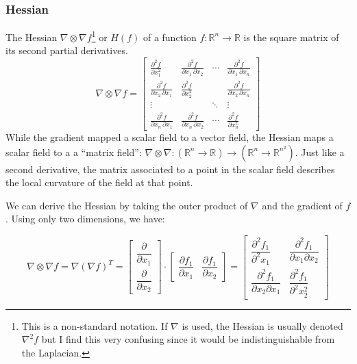 \documentclass{article}
\begin{document}
\subsubsection{Hessian}

The Hessian $\nabla \otimes \nabla f$\footnote{This is a non-standard notation.
If $\nabla$ is used, the Hessian is usually denoted $\nabla^2 f$ but I find this
very confusing since it would be indistinguishable from the Laplacian.} or
$H(f)$ of a function $ f: \mathbb{R}^n \longrightarrow \mathbb{R} $ is the
square matrix of its second partial derivatives. \[
    \nabla \otimes \nabla f =
    \begin{bmatrix}
        \frac{\partial^2 f}{\partial x_1^2} &
        \frac{\partial^2 f}{\partial x_1\,\partial x_2} &
        \cdots & \frac{\partial^2 f}{\partial x_1\,\partial x_n} \\ 
        \frac{\partial^2 f}{\partial x_2\,\partial x_1}
        & \frac{\partial^2 f}{\partial x_2^2} &  &
        \frac{\partial^2 f}{\partial x_2\,\partial x_n} \\ 
        \vdots &   & \ddots & \vdots \\ 
        \frac{\partial^2 f}{\partial x_n\,\partial x_1}
        & \frac{\partial^2 f}{\partial x_n\,\partial x_2} &
        \cdots & \frac{\partial^2 f}{\partial x_n^2}
    \end{bmatrix}
\]
While the gradient mapped a scalar field to a vector field, the Hessian maps a
scalar field to a a ``matrix field'': $\nabla \otimes \nabla : (\mathbb{R}^n
\rightarrow \mathbb{R}) \longrightarrow (\mathbb{R}^n \rightarrow
\mathbb{R}^{n^2})$. Just like a second derivative, the matrix associated to a
point in the scalar field describes the local curvature of the field at that
point.

We can derive the Hessian by taking the outer product of $\nabla$ and the
gradient of $f$. Using only two dimensions, we have:

\[
\nabla \otimes \nabla f = \nabla (\nabla{f})^T = 
    \begin{bmatrix}
        \dfrac{\partial }{\partial x_1} \\ 
        \dfrac{\partial }{\partial x_2}
    \end{bmatrix} \cdot
    \begin{bmatrix}
        \dfrac{\partial f_1}{\partial x_1} &
        \dfrac{\partial f_1}{\partial x_2}
    \end{bmatrix} =
    \begin{bmatrix}
        \dfrac{\partial^2 f_1}{\partial^2 x_1} &
        \dfrac{\partial^2 f_1}{\partial x_1 \partial x_2} \\ 
        \dfrac{\partial^2 f_1}{\partial x_2 \partial x_1} &
        \dfrac{\partial^2 f_1}{\partial^2 x_2^2}
    \end{bmatrix}
\]
\end{document}
